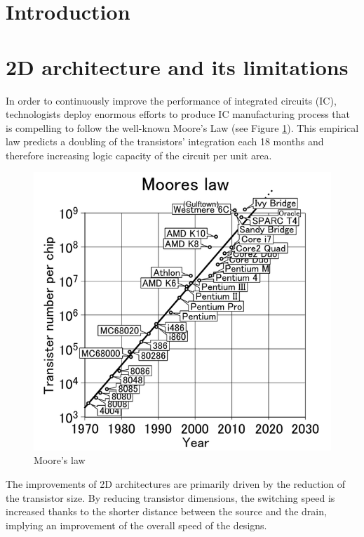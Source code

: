 \label{cha:rol.icdesign}

\begin{summary}
\lipsum[1]
\end{summary}

\section{Introduction}

\section{2D architecture and its limitations}

In order to continuously improve the performance of integrated circuits (IC), technologists deploy enormous efforts to produce IC manufacturing process that is compelling to follow the well-known Moore's Law (see Figure \ref{fig:mooreslaw}). This empirical law predicts a doubling of the transistors' integration each 18 months and therefore increasing logic capacity of the circuit per unit area. 

\begin{figure}
\begin{center}
\includegraphics[width=0.75\linewidth]{mooreslaw.png}
\end{center}
\vspace{-0.5cm}
\caption{Moore's law \cite{mooreslawpic}}
\label{fig:mooreslaw}
\end{figure}

The improvements of 2D architectures are primarily driven by the reduction of the transistor size. By reducing transistor dimensions, the switching speed is increased thanks to the shorter distance between the source and the drain, implying an improvement of the overall speed of the designs.

